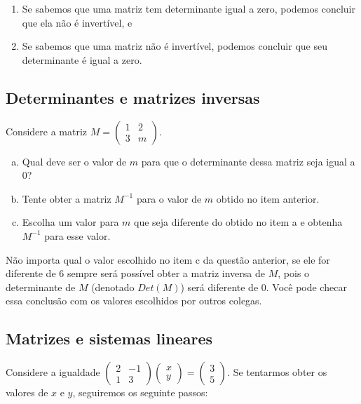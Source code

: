 \documentclass[main_estudante.tex]{subfiles}
\begin{document}
\begin{enumerate}
 \item Se sabemos que uma matriz tem determinante igual a zero, podemos concluir que ela não é invertível, e
 \item Se sabemos que uma matriz não é invertível, podemos concluir que seu determinante é igual a zero.
\end{enumerate}

\subsection*{Determinantes e matrizes inversas}

\begin{questao}
Considere a matriz $M=\begin{pmatrix}1 & 2 \\ 3 & m\end{pmatrix}$.
\begin{enumerate}[a)]
\item Qual deve ser o valor de $m$ para que o determinante dessa matriz seja igual a 0?
\item Tente obter a matriz $M^{-1}$ para o valor de $m$ obtido no item anterior.
\item Escolha um valor para $m$ que seja diferente do obtido no item a e obtenha $M^{-1}$ para esse valor.
\end{enumerate}
\end{questao}

Não importa qual o valor escolhido no item c da questão anterior, se ele for diferente de 6 sempre será possível obter a matriz inversa de $M$, pois o determinante de $M$ (denotado $Det(M)$) será diferente de 0. Você pode checar essa conclusão com os valores escolhidos por outros colegas.

\subsection*{Matrizes e sistemas lineares}

Considere a igualdade $\begin{pmatrix}2 & -1 \\ 1 & 3\end{pmatrix} \begin{pmatrix}x \\ y\end{pmatrix} = \begin{pmatrix}3 \\ 5\end{pmatrix}$. Se tentarmos obter os valores de $x$ e $y$, seguiremos os seguinte passos:
\end{document}
